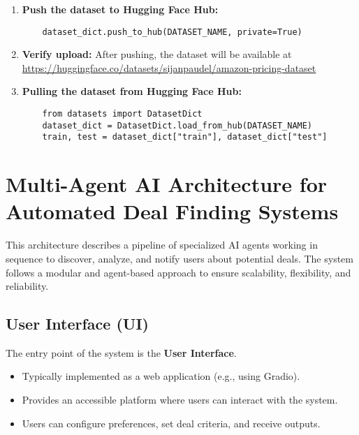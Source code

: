 \documentclass[a4paper, 12pt]{article}
\begin{document}
\begin{tcolorbox}[colback=green!5!white, colframe=green!75!black, title=Dataset Upload Guide]
\begin{enumerate}
    \item \textbf{Push the dataset to Hugging Face Hub:}
    \begin{verbatim}
    dataset_dict.push_to_hub(DATASET_NAME, private=True)
    \end{verbatim}
    
    \item \textbf{Verify upload:} After pushing, the dataset will be available at \url{https://huggingface.co/datasets/sijanpaudel/amazon-pricing-dataset}


    \item \textbf{Pulling the dataset from Hugging Face Hub:}
    \begin{verbatim}
    from datasets import DatasetDict
    dataset_dict = DatasetDict.load_from_hub(DATASET_NAME)
    train, test = dataset_dict["train"], dataset_dict["test"]
    \end{verbatim}
\end{enumerate}
\end{tcolorbox}

\newpage

\section*{Multi-Agent AI Architecture for Automated Deal Finding Systems}

This architecture describes a pipeline of specialized AI agents working in sequence to discover, analyze, and notify users about potential deals. The system follows a modular and agent-based approach to ensure scalability, flexibility, and reliability.

\subsection*{User Interface (UI)}

The entry point of the system is the \textbf{User Interface}.
\begin{itemize}
    \item Typically implemented as a web application (e.g., using Gradio).  
    \item Provides an accessible platform where users can interact with the system.  
    \item Users can configure preferences, set deal criteria, and receive outputs.  
\end{itemize}
\end{document}
